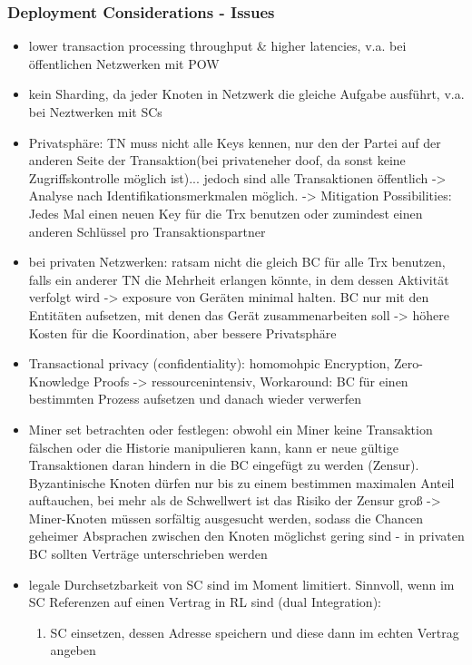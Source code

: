     \subsubsection{Deployment Considerations - Issues}
        \begin{itemize}
            \item lower transaction processing throughput \& higher latencies, v.a. bei öffentlichen Netzwerken mit POW
            \item kein Sharding, da jeder Knoten in Netzwerk die gleiche Aufgabe ausführt, v.a. bei Neztwerken mit SCs
            \item Privatsphäre: TN muss nicht alle Keys kennen, nur den der Partei auf der anderen Seite der Transaktion(bei privateneher doof, da sonst keine Zugriffskontrolle möglich ist)... jedoch sind alle Transaktionen öffentlich -> Analyse nach Identifikationsmerkmalen möglich. -> Mitigation Possibilities: Jedes Mal einen neuen Key für die Trx benutzen oder zumindest einen anderen Schlüssel pro Transaktionspartner
            \item bei privaten Netzwerken: ratsam nicht die gleich BC für alle Trx benutzen, falls ein anderer TN die Mehrheit erlangen könnte, in dem dessen Aktivität verfolgt wird -> exposure von Geräten minimal halten. BC nur mit den Entitäten aufsetzen, mit denen das Gerät zusammenarbeiten soll -> höhere Kosten für die Koordination, aber bessere Privatsphäre
            \item Transactional privacy (confidentiality): homomohpic Encryption, Zero-Knowledge Proofs -> ressourcenintensiv, Workaround: BC für einen bestimmten Prozess aufsetzen und danach wieder verwerfen
            \item Miner set betrachten oder festlegen: obwohl ein Miner keine Transaktion fälschen oder die Historie manipulieren kann, kann er neue gültige Transaktionen daran hindern in die BC eingefügt zu werden (Zensur). Byzantinische Knoten dürfen nur bis zu einem bestimmen maximalen Anteil auftauchen, bei mehr als de Schwellwert ist das Risiko der Zensur groß -> Miner-Knoten müssen sorfältig ausgesucht werden, sodass die Chancen geheimer Absprachen zwischen den Knoten möglichst gering sind - in privaten BC sollten Verträge unterschrieben werden
            \item legale Durchsetzbarkeit von SC sind im Moment limitiert. Sinnvoll, wenn im SC Referenzen auf einen Vertrag in RL sind (dual Integration): 
                \begin{enumerate}
                    \item SC einsetzen, dessen Adresse speichern und diese dann im echten Vertrag angeben

\end{enumerate}
\end{itemize}
